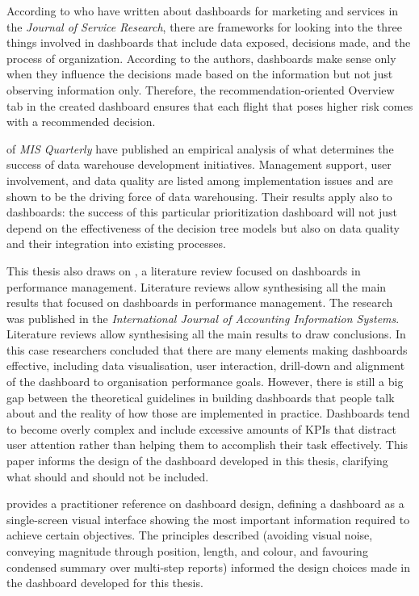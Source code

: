 According to \citet{Pauwels2009} who have written about dashboards for marketing and services in the \textit{Journal of Service Research}, there are frameworks for looking into the three things involved in dashboards that include data exposed, decisions made, and the process of organization. According to the authors, dashboards make sense only when they influence the decisions made based on the information but not just observing information only. Therefore, the recommendation-oriented Overview tab in the created dashboard ensures that each flight that poses higher risk comes with a recommended decision.

\citet{WixomWatson2001} of \textit{MIS Quarterly} have published an empirical analysis of what determines the success of data warehouse development initiatives. Management support, user involvement, and data quality are listed among implementation issues and are shown to be the driving force of data warehousing. Their results apply also to dashboards: the success of this particular prioritization dashboard will not just depend on the effectiveness of the decision tree models but also on data quality and their integration into existing processes.

This thesis also draws on \citet{YigitbasiogluVelcu2012}, a literature review focused on dashboards in performance management. Literature reviews allow synthesising all the main results that focused on dashboards in performance management. The research was published in the \textit{International Journal of Accounting Information Systems}. Literature reviews allow synthesising all the main results to draw conclusions. In this case researchers concluded that there are many elements making dashboards effective, including data visualisation, user interaction, drill-down and alignment of the dashboard to organisation performance goals. However, there is still a big gap between the theoretical guidelines in building dashboards that people talk about and the reality of how those are implemented in practice. Dashboards tend to become overly complex and include excessive amounts of KPIs that distract user attention rather than helping them to accomplish their task effectively. This paper informs the design of the dashboard developed in this thesis, clarifying what should and should not be included.

\citet{Few2013} provides a practitioner reference on dashboard design, defining a dashboard as a single-screen visual interface showing the most important information required to achieve certain objectives. The principles described (avoiding visual noise, conveying magnitude through position, length, and colour, and favouring condensed summary over multi-step reports) informed the design choices made in the dashboard developed for this thesis.

